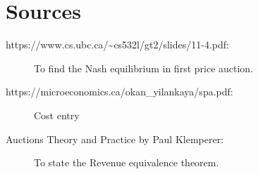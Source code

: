 \documentclass[12pt]{article}
\begin{document}
\newpage
\section*{Sources}
\begin{description}
\item[https://www.cs.ubc.ca/\textasciitilde cs532l/gt2/slides/11-4.pdf:] To find the Nash equilibrium in first price auction.
\item[https://microeconomics.ca/okan\_yilankaya/spa.pdf: ] Cost entry
\item[Auctions Theory and Practice by Paul Klemperer:] To state the Revenue equivalence theorem.
\end{description}
\end{document}
